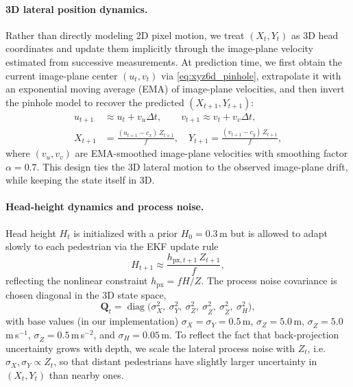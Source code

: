 \paragraph{3D lateral position dynamics.}
Rather than directly modeling 2D pixel motion, we treat $(X_t, Y_t)$ as 3D head coordinates and update them implicitly through the image-plane velocity estimated from successive measurements. At prediction time, we first obtain the current image-plane center $(u_t, v_t)$ via \eqref{eq:xyz6d_pinhole}, extrapolate it with an exponential moving average (EMA) of image-plane velocities, and then invert the pinhole model to recover the predicted $(X_{t+1}, Y_{t+1})$:
\begin{equation}
\label{eq:xyz6d_backproj}
\begin{aligned}
u_{t+1} &\approx u_t + v_u \Delta t, \qquad
v_{t+1} \approx v_t + v_v \Delta t,\\
X_{t+1} &= \frac{(u_{t+1} - c_x)\,Z_{t+1}}{f},\quad
Y_{t+1} = \frac{(v_{t+1} - c_y)\,Z_{t+1}}{f},
\end{aligned}
\end{equation}
where $(v_u, v_v)$ are EMA-smoothed image-plane velocities with smoothing factor $\alpha = 0.7$. This design ties the 3D lateral motion to the observed image-plane drift, while keeping the state itself in 3D.

\paragraph{Head-height dynamics and process noise.}
Head height $H_t$ is initialized with a prior $H_0 = 0.3$\,m but is allowed to adapt slowly to each pedestrian via the EKF update rule
\begin{equation}
H_{t+1} \approx \frac{h_{\text{px},t+1}\,Z_{t+1}}{f},
\end{equation}
reflecting the nonlinear constraint $h_{\text{px}} = f H / Z$. The process noise covariance is chosen diagonal in the 3D state space,
\begin{equation}
\mathbf{Q}_t = \operatorname{diag}\big(
   \sigma_X^2,\ \sigma_Y^2,\ \sigma_Z^2,\ 
   \sigma_{\dot{Z}}^2,\ \sigma_{\ddot{Z}}^2,\ \sigma_H^2
\big),
\end{equation}
with base values (in our implementation) $\sigma_X = \sigma_Y = 0.5$\,m, $\sigma_Z = 5.0$\,m, $\sigma_{\dot{Z}} = 5.0$\,m\,s$^{-1}$, $\sigma_{\ddot{Z}} = 0.5$\,m\,s$^{-2}$, and $\sigma_H = 0.05$\,m. To reflect the fact that back-projection uncertainty grows with depth, we scale the lateral process noise with $Z_t$, i.e.\ $\sigma_X, \sigma_Y \propto Z_t$, so that distant pedestrians have slightly larger uncertainty in $(X_t, Y_t)$ than nearby ones.

